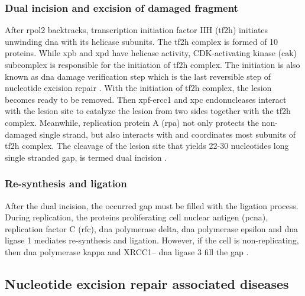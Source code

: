 \subsubsection{Dual incision and excision of damaged fragment}

After \gls{rpol2} backtracks, transcription initiation factor IIH (\gls{tf2h}) initiates unwinding \gls{dna} with its helicase subunits. The \gls{tf2h} complex is formed of 10 proteins. While \gls{xpb} and \gls{xpd} have helicase activity, CDK-activating kinase (\gls{cak}) subcomplex is responsible for the initiation of \gls{tf2h} complex. The initiation is also known as \gls{dna} damage verification step which is the last reversible step of nucleotide excision repair \citep{marteijn2014understanding}. With the initiation of \gls{tf2h} complex, the lesion becomes ready to be removed. Then \gls{xpf}-\gls{ercc1} and \gls{xpc} endonucleases interact with the lesion site to catalyze the lesion from two sides together with the \gls{tf2h} complex. Meanwhile, replication protein A (\gls{rpa}) not only protects the non-damaged single strand, but also interacts with and coordinates most subunits of \gls{tf2h} complex. The cleavage of the lesion site that yields 22-30 nucleotides long single stranded gap, is termed dual incision \citep{marteijn2014understanding}.

\subsubsection{Re-synthesis and ligation}

After the dual incision, the occurred gap must be filled with the ligation process. During replication, the proteins proliferating cell nuclear antigen (\gls{pcna}), replication factor C (\gls{rfc}), \gls{dna} polymerase \gls{delta}, \gls{dna} polymerase \gls{epsilon} and \gls{dna} ligase 1 mediates re-synthesis and ligation. However, if the cell is non-replicating, then \gls{dna} polymerase \gls{kappa} and XRCC1– \gls{dna} ligase 3 fill the gap \citep{marteijn2014understanding}.

\subsection{Nucleotide excision repair associated diseases}


